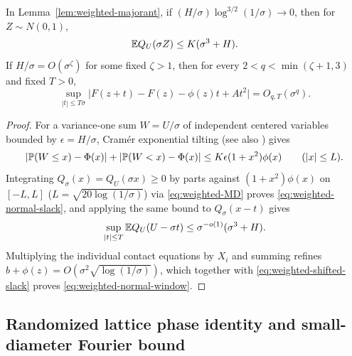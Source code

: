 \begin{lemma}\label{lem:weighted-normal}
In Lemma~\ref{lem:weighted-majorant}, if $(H/\sigma)\log^{3/2}(1/\sigma)\to0$,
then for $Z\sim N(0,1)$,
\begin{equation}\label{eq:weighted-normal-slack}
                         \mathbb E Q_U(\sigma Z)\le K(\sigma^3+H).
\end{equation}
If $H/\sigma=O(\sigma^\zeta)$ for some fixed $\zeta>1$, then for every
$2<q<\min(\zeta+1,3)$ and fixed $T>0$,
\begin{equation}\label{eq:weighted-normal-window}
 \sup_{|t|\le T\sigma}
 \bigl|F(z+t)-F(z)-\phi(z)t+At^2\bigr|=O_{q,T}(\sigma^q).
\end{equation}
\end{lemma}
\begin{proof}
For a variance-one sum $W=U/\sigma$ of independent centered variables bounded
by $\epsilon=H/\sigma$, Cram\'er exponential tilting (see also
\citet[Theorem~2.1]{BeknazaryanSangXiao2019}) gives
\begin{equation}\label{eq:weighted-MD}
 |\mathbb P(W\le x)-\Phi(x)|+|\mathbb P(W<x)-\Phi(x)|
       \le K\epsilon(1+x^2)\phi(x)\qquad(|x|\le L).
\end{equation}
Integrating $Q_\sigma(x)=Q_U(\sigma x)\ge0$ by parts against $(1+x^2)\phi(x)$
on $[-L,L]$ ($L=\sqrt{20\log(1/\sigma)}$) via \eqref{eq:weighted-MD} proves
\eqref{eq:weighted-normal-slack}, and applying the same bound to
$Q_\sigma(x-t)$ gives
\begin{equation}\label{eq:weighted-shifted-slack}
 \sup_{|t|\le T}\mathbb E Q_U(U-\sigma t)
                         \le\sigma^{-o(1)}(\sigma^3+H).
\end{equation}
Multiplying the individual contact equations by $X_i$ and summing refines
$b+\phi(z)=O(\sigma^2\sqrt{\log(1/\sigma)})$, which together with
\eqref{eq:weighted-shifted-slack} proves \eqref{eq:weighted-normal-window}.
\end{proof}

\subsection{Randomized lattice phase identity and small-diameter Fourier bound}
\label{subsec:weighted-phase}

